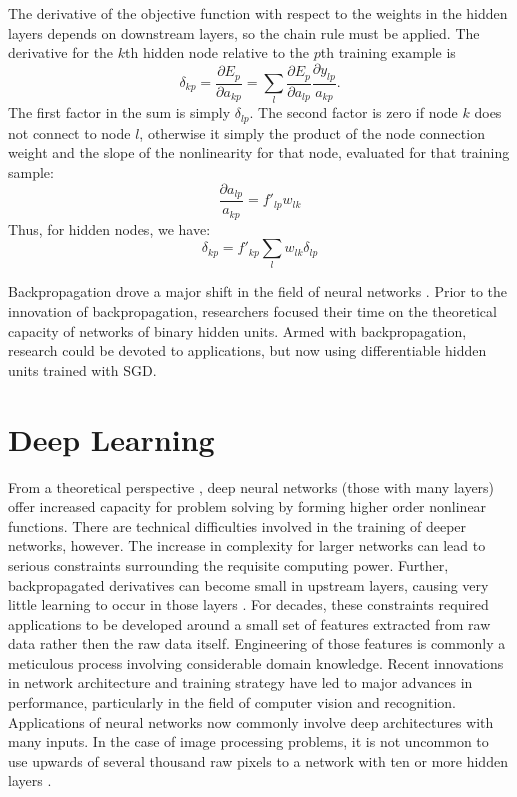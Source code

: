The derivative of the objective function with respect to the weights in the hidden layers depends on downstream layers, so the chain rule must be applied.  The derivative for the $k$th hidden node relative to the $p$th training example is
\begin{equation}
\delta_{kp} = \frac{\partial E_p}{\partial a_{kp}} = \sum_l \frac{\partial E_p}{\partial a_{lp}}\frac{\partial y_{lp}}{a_{kp}}.
\end{equation}
The first factor in the sum is simply $\delta_{lp}$.  The second factor is zero if node $k$ does not connect to node $l$, otherwise it simply the product of the node connection weight and the slope of the nonlinearity for that node, evaluated for that training sample:
\begin{equation}
\frac{\partial a_{lp}}{a_{kp}} = f'_{lp} w_{lk}
\end{equation}
Thus, for hidden nodes, we have:
\begin{equation}
\delta_{kp} = f'_{kp} \sum_l w_{lk}\delta_{lp}
\end{equation}

Backpropagation drove a major shift in the field of neural networks \cite{reed1999neural}.
Prior to the innovation of backpropagation, researchers focused their time on the theoretical capacity of networks of binary hidden units.
Armed with backpropagation, research could be devoted to applications, but now
using differentiable hidden units trained with SGD.


\section{Deep Learning}
\label{deeplearning}

From a theoretical perspective \cite{reed1999neural},
deep neural networks (those with many layers) offer increased capacity for
problem solving by forming higher order nonlinear functions.  There are technical difficulties involved in the training of deeper networks, however.
The increase in complexity for larger networks can lead to serious constraints
surrounding the requisite computing power.
Further, backpropagated derivatives can become small in upstream layers, causing very little learning to occur in those layers
\cite{reed1999neural,szegedy2014going}.
For decades, these constraints required applications to be developed around a small set of features extracted from raw data rather then the raw data itself.  Engineering of those features is commonly a meticulous process involving considerable domain knowledge.  Recent innovations in network architecture and training strategy have led to major advances in performance, particularly in the field of computer vision and recognition.
Applications of neural networks now commonly involve deep architectures with many inputs.
In the case of image processing problems, it is not uncommon to use upwards of several thousand raw pixels to a network with ten or more hidden layers
\cite{lecun2015deep}.

